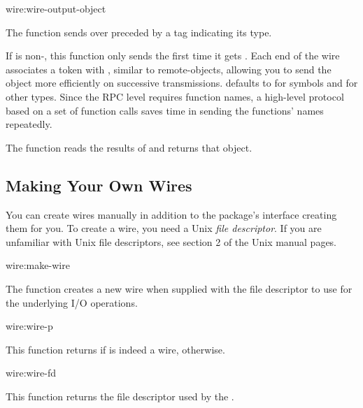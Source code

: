 \begin{defun}{wire:}{wire-output-object}{%
    }
  
  The function  sends  over
   preceded by a tag indicating its type.
  
  If  is non-\nil, this function only sends 
  the first time it gets .  Each end of the wire
  associates a token with , similar to remote-objects,
  allowing you to send the object more efficiently on successive
  transmissions.   defaults to \true{} for symbols and
  \nil{} for other types.  Since the RPC level requires function
  names, a high-level protocol based on a set of function calls saves
  time in sending the functions' names repeatedly.
  
  The function  reads the results of
   and returns that object.
\end{defun}


\subsection{Making Your Own Wires}

You can create wires manually in addition to the 
package's interface creating them for you. To create a wire, you need
a Unix {\em file descriptor}. If you are unfamiliar with Unix file
descriptors, see section 2 of the Unix manual pages.

\begin{defun}{wire:}{make-wire}{}

  The function  creates a new wire when supplied with
  the file descriptor to use for the underlying I/O operations.
\end{defun}

\begin{defun}{wire:}{wire-p}{}
  
  This function returns \true{} if  is indeed a wire,
  \nil{} otherwise.
\end{defun}

\begin{defun}{wire:}{wire-fd}{}
  
  This function returns the file descriptor used by the .
\end{defun}


